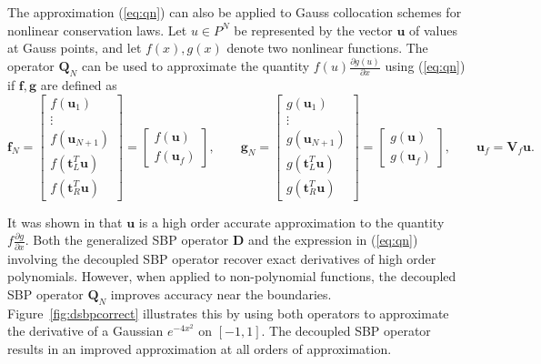 \documentclass[onefignum,onetabnum,final]{siamart171218}
\newcommand{\pd}[2]{\frac{\partial#1}{\partial#2}}
\newcommand{\LRp}[1]{\left( #1 \right)}
\begin{document}
The approximation (\ref{eq:qn}) can also be applied to Gauss collocation schemes for nonlinear conservation laws. Let $u \in P^N$ be represented by the vector $\bm{u}$ of values at Gauss points, and let $f(x), g(x)$ denote two nonlinear functions.   The operator $\bm{Q}_N$ can be used to approximate the quantity $f(u)\pd{g(u)}{x}$ using (\ref{eq:qn}) if $\bm{f}, \bm{g}$ are defined as
\[
\bm{f}_N = \begin{bmatrix}
f\LRp{\bm{u}_1}\\
\vdots\\
f\LRp{\bm{u}_{N+1}}\\
f\LRp{\bm{t}_L^T\bm{u}}\\
f\LRp{\bm{t}_R^T\bm{u}}
\end{bmatrix} = \begin{bmatrix}
f(\bm{u}) \\
f(\bm{u}_f)
\end{bmatrix}, \qquad
\bm{g}_N = \begin{bmatrix}
g\LRp{\bm{u}_1}\\
\vdots\\
g\LRp{\bm{u}_{N+1}}\\
g\LRp{\bm{t}_L^T\bm{u}}\\
g\LRp{\bm{t}_R^T\bm{u}}
\end{bmatrix} = \begin{bmatrix}
g(\bm{u}) \\
g(\bm{u}_f)
\end{bmatrix}, \qquad \bm{u}_f = \bm{V}_f\bm{u}.
\]

It was shown in \cite{chan2017discretely} that $\bm{u}$ is a high order accurate approximation to the quantity $f\pd{g}{x}$.  Both the generalized SBP operator $\bm{D}$ and the expression in (\ref{eq:qn}) involving the decoupled SBP operator recover exact derivatives of high order polynomials.  However, when applied to non-polynomial functions, the decoupled SBP operator $\bm{Q}_N$ improves accuracy near the boundaries.  Figure~\ref{fig:dsbpcorrect} illustrates this by using both operators to approximate the derivative of a Gaussian $e^{-4x^2}$ on $[-1,1]$.  The decoupled SBP operator results in an improved approximation at all orders of approximation.  %
\end{document}
